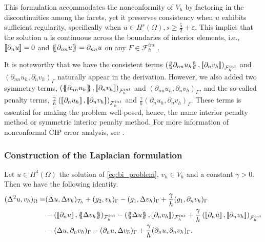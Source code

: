 \begin{remark}
    This formulation accommodates the nonconformity of $V_{h}$ by factoring in the discontinuities among the facets, yet it preserves consistency when $u$ exhibits sufficient regularity, specifically when $u\in H^{s}( \Omega ), s\ge \frac{5}{2} +
\varepsilon $. This implies that the solution $u$  is continuous across the boundaries of interior elements, i.e.,  $\left[\!\left[  \partial _{n} u  \right]\!\right]   = 0 $ and  $\left\{\!\!\left\{ \partial _{nn} u \right\}\!\!\right\}   = \partial _{nn} u $ on any $ F \in \mathcal{F} ^{int}_{h} $ .

It is noteworthy that we have the consistent terms $\left( \left\{\!\!\left\{  \partial _{n n} u_{h} \right\}\!\!\right\}, \left[\!\left[  \partial _{n }v_{h} \right]\!\right] \right)_{\mathcal{F}_{h}^{int}} $ and $ \left(   \partial _{n n} u_{h} ,  \partial _{n }v_h \right)_{\Gamma }$ naturally appear in the
derivation. However, we also added two symmetry terms,  $\left( \left\{\!\!\left\{  \partial _{n n} u_{h} \right\}\!\!\right\}, \left[\!\left[  \partial _{n }v_{h} \right]\!\right]
\right)_{\mathcal{F}_{h}^{int}} $ and $ \left(   \partial _{n n} u_{h} ,  \partial _{n }v_{h} \right)_{\Gamma }$, and the so-called penalty terms, $ \frac{\gamma }{h}  \left( \left[\!\left[  \partial _{n} u_{h} \right]\!\right], \left[\!\left[  \partial _{n} v_{h}    \right]\!\right]   \right)_{\mathcal{F}_{h}^{int}}$ and $ \frac{\gamma }{h}  \left(  \partial _{n} u_{h},  \partial _{n} v_{h}      \right)_{\Gamma }$.
     These terms is essential for making the problem well-posed, hence, the name interior penalty method or symmetric interior penalty method. For more information of  nonconformal CIP error analysis, see \cite[Chapter 1.3]{pietro2012}.
\end{remark}

\subsubsection{Construction of the Laplacian formulation}%
\label{ssub:construction_of_the_laplacian_formulation}


\begin{lemma}

 Let $u \in H^{4}( \Omega ) $ the solution of \eqref{eq:bi_problem}, $v_{h} \in  V_{h}$ and a constant $\gamma >0$. Then we have the following identity.
\[
    \begin{split}
( \Delta ^2 u, v_{h} ) _{\Omega }  =& ( \Delta u, \Delta v_{h})_{\mathcal{T} _{h} }  + ( g_{2} , v_{h} )_{\Gamma }  - ( g_{1} , \Delta v_{h})_{\Gamma } + \frac{\gamma }{h} ( g_{1} ,  \partial _{n}v_{h})_{\Gamma }\\
& -  ( \jump{ \partial _{n} u} , \mean{ \Delta v_{h} })_{\mathcal{F}_{h}^{int} }-  (  \mean{ \Delta u }, \jump{ \partial _{n} v_{h}} )_{\mathcal{F}_{h}^{int} } + \frac{\gamma }{h}  \left( \jump{ \partial _{n} u}, \jump{ \partial _{n} v_{h}   }
\right)_{\mathcal{F}_{h}^{int} } \\
& - (  \Delta u, \partial _{n} v_{h})_{\Gamma }- ( \partial _{n} u, \Delta v_{h})_{\Gamma } + \frac{\gamma }{h}( \partial _{n} u, \partial _{n} v_{h})_{\Gamma }   .
    \end{split}
\]
\end{lemma}

